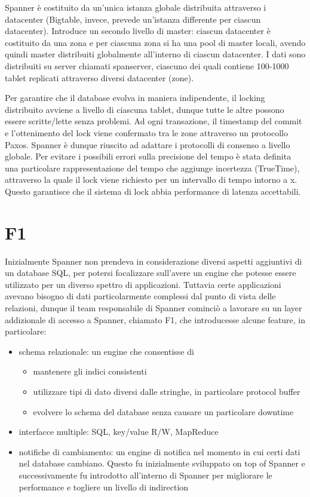 Spanner è costituito da un'unica istanza globale distribuita attraverso i datacenter (Bigtable, invece, prevede un'istanza differente per ciascun datacenter). Introduce un secondo livello di master: ciascun datacenter è costituito da una zona e per ciascuna zona si ha una pool di master locali, avendo quindi master distribuiti globalmente all'interno di ciascun datacenter. I dati sono distribuiti su server chiamati spanserver, ciascuno dei quali contiene 100-1000 tablet replicati attraverso diversi datacenter (zone). 

Per garantire che il database evolva in maniera indipendente, il locking distribuito avviene a livello di ciascuna tablet, dunque tutte le altre possono essere scritte/lette senza problemi. Ad ogni transazione, il timestamp del commit e l'ottenimento del lock viene confermato tra le zone attraverso un protocollo Paxos. Spanner è dunque riuscito ad adattare i protocolli di consenso a livello globale. Per evitare i possibili errori sulla precisione del tempo è stata definita una particolare rappresentazione del tempo che aggiunge incertezza (TrueTime), attraverso la quale il lock viene richiesto per un intervallo di tempo intorno a x. Questo garantisce che il sistema di lock abbia performance di latenza accettabili.

\section{F1}

Inizialmente Spanner non prendeva in considerazione diversi aspetti aggiuntivi di un database SQL, per potersi focalizzare sull'avere un engine che potesse essere utilizzato per un diverso spettro di applicazioni. Tuttavia certe applicazioni avevano bisogno di dati particolarmente complessi dal punto di vista delle relazioni, dunque il team responsabile di Spanner cominciò a lavorare su un layer addizionale di accesso a Spanner, chiamato F1, che introducesse alcune feature, in particolare:

\begin{itemize}
    \item schema relazionale: un engine che consentisse di
    \begin{itemize}
        \item mantenere gli indici consistenti
        \item utilizzare tipi di dato diversi dalle stringhe, in particolare protocol buffer
        \item evolvere lo schema del database senza causare un particolare downtime
    \end{itemize}
    \item interfacce multiple: SQL, key/value R/W, MapReduce
    \item notifiche di cambiamento:  un engine di notifica nel momento in cui certi dati nel database cambiano. Questo fu inizialmente sviluppato on top of Spanner e successivamente fu introdotto all'interno di Spanner per migliorare le performance e togliere un livello di indirection
\end{itemize}

